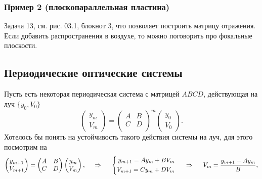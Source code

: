 \subsubsection*{Пример 2 (плоскопараллельная пластина)}

Задача 13, см. рис. 03.1, блокнот 3, что позволяет построить матрицу отражения. Если добавить распространения в воздухе, то можно поговорить про фокальные плоскости. 


\subsection{Периодические оптические системы}

Пусть есть некоторая периодическая система с матрицей $ABCD$, действующая на луч $\{y_0, V_0\}$
\begin{equation*}
    \begin{pmatrix}
        y_m \\ V_m
    \end{pmatrix} = 
    \begin{pmatrix}
        A & B \\
        C & D \\
    \end{pmatrix}^m
    \begin{pmatrix}
        y_0 \\ V_0
    \end{pmatrix}.
\end{equation*}
Хотелось бы понять на устойчивость такого действия системы на луч, для этого посмотрим на 
\begin{equation*}
    \begin{pmatrix}
        y_{m+1} \\ V_{m+1}
    \end{pmatrix} = 
    \begin{pmatrix}
        A & B \\
        C & D \\
    \end{pmatrix} \begin{pmatrix}
        y_m \\ V_m
    \end{pmatrix},
    \hspace{0.5cm} \Rightarrow \hspace{0.5cm}
    \left\{\begin{aligned}
        y_{m+1} = A y_m + B V_m \\
        V_{m+1} = C y_m + D V_m
    \end{aligned}\right.
    \hspace{0.5cm} \Rightarrow \hspace{0.5cm}
    V_m = \frac{y_{m+1}-Ay_m}{B},
\end{equation*}
